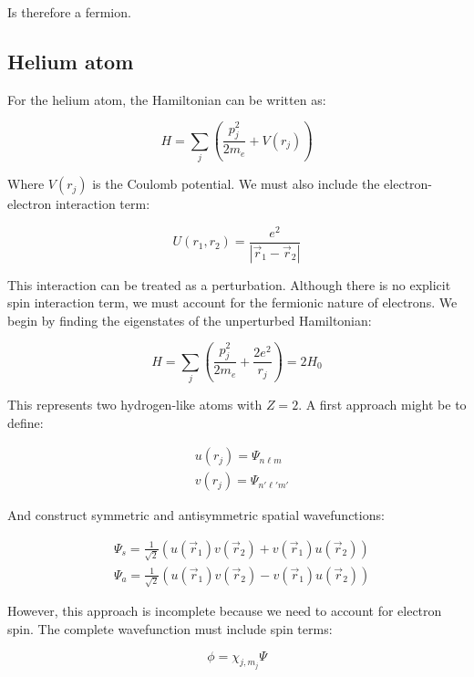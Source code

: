 \documentclass[italian]{HKNdocument}
\begin{document}
Is therefore a fermion.

\subsection{Helium atom}
For the helium atom, the Hamiltonian can be written as:

\begin{equation}
H=\sum_j(\frac{p_j^2}{2m_e}+V(r_j)) \label{eq:14.31}
\end{equation}

Where $V(r_j)$ is the Coulomb potential. We must also include the electron-electron interaction term:

\begin{equation}
U(r_1,r_2)=\frac{e^2}{|\vec{r}_1-\vec{r}_2|} \label{eq:14.32}
\end{equation}

This interaction can be treated as a perturbation. Although there is no explicit spin interaction term, we must account for the fermionic nature of electrons. We begin by finding the eigenstates of the unperturbed Hamiltonian:

\begin{equation}
H=\sum_j(\frac{p_j^2}{2m_e}+\frac{2e^2}{r_j})=2H_0 \label{eq:14.33}
\end{equation}

This represents two hydrogen-like atoms with $Z=2$. A first approach might be to define:

\begin{align}
&u(r_j)=\Psi_{n\ell m} \label{eq:14.34}\\
&v(r_j)=\Psi_{n'\ell'm'}
\end{align}

And construct symmetric and antisymmetric spatial wavefunctions:

\begin{align}
&\Psi_s=\frac{1}{\sqrt{2}}(u(\vec{r}_1)v(\vec{r}_2)+v(\vec{r}_1)u(\vec{r}_2)) \label{eq:14.35}\\
&\Psi_a=\frac{1}{\sqrt{2}}(u(\vec{r}_1)v(\vec{r}_2)-v(\vec{r}_1)u(\vec{r}_2))
\end{align}

However, this approach is incomplete because we need to account for electron spin. The complete wavefunction must include spin terms:

\begin{equation}
\phi=\chi_{j,m_j}\Psi \label{eq:14.36}
\end{equation}
\end{document}
